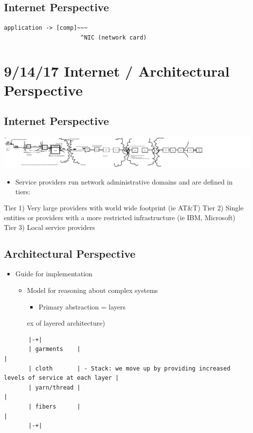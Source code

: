 \documentclass[11pt]{article}
\begin{document}
\subsection{Internet Perspective}
\label{sec:orgheadline5}

\begin{verbatim}
application -> [comp]~~~
                      ^NIC (network card)
\end{verbatim}

\section{9/14/17  Internet / Architectural Perspective}
\label{sec:orgheadline9}

\subsection{Internet Perspective}
\label{sec:orgheadline7}
\includegraphics[width=.9\linewidth]{diagrams/fig1.png}

\begin{itemize}
\item Service providers run network administrative domains and are
defined in tiers:
\end{itemize}
Tier 1) Very large providers with world wide footprint (ie AT\&T)
Tier 2) Single entities or providers with a more restricted
infrastructure (ie IBM, Microsoft)
Tier 3) Local service providers

\subsection{Architectural Perspective}
\label{sec:orgheadline8}
\begin{itemize}
\item Guide for implementation
\begin{itemize}
\item Model for reasoning about complex systems
\begin{itemize}
\item Primary abstraction = layers
\end{itemize}
ex of layered architecture)
\end{itemize}
\end{itemize}
\begin{verbatim}
       |-+|
       | garments    |                                                                            |
       | cloth       | - Stack: we move up by providing increased levels of service at each layer |
       | yarn/thread |                                                                            |
       | fibers      |                                                                            |
       |-+|
\end{verbatim}
\end{document}
